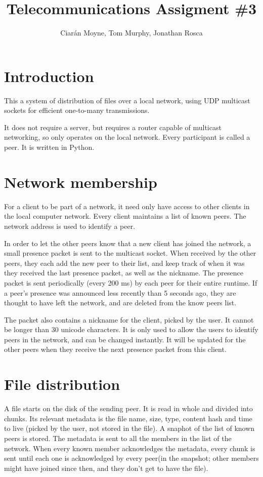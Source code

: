 \documentclass[a4paper, 10pt]{report}
\title{Telecommunications Assigment \#3}
\author{Ciar\'{a}n Moyne, Tom Murphy, Jonathan Rosca}
\begin{document}
\maketitle
\section{Introduction}
This a system of distribution of files over a local network, using UDP multicast sockets for efficient one-to-many transmissions. 

It does not require a server, but requires a router capable of multicast networking, so only operates on the local network. Every participant is called a peer. It is written in Python.


\section{Network membership}
For a client to be part of a network, it need only have access to other clients in the local computer network. Every client maintains a list of known peers. The network address is used to identify a peer.

In order to let the other peers know that a new client has joined the network, a small presence packet is sent to the multicast socket. When received by the other peers, they each add the new peer to their list, and keep track of when it was they received the last presence packet, as well as the nickname. The presence packet is sent periodically (every 200 ms) by each peer for their entire runtime. If a peer's presence was announced less recently than 5 seconds ago, they are thought to have left the network, and are deleted from the know peers list.

The packet also contains a nickname for the client, picked by the user. It cannot be longer than 30 unicode characters. It is only used to allow the users to identify peers in the network, and can be changed instantly. It will be updated for the other peers when they receive the next presence packet from this client.


\section{File distribution}
A file starts on the disk of the sending peer. It is read in whole and divided into chunks. Its relevant metadata is the file name, size, type, content hash and time to live (picked by the user, not stored in the file). A snaphot of the list of known peers is stored. The metadata is sent to all the members in the list of the network. When every known member acknowledges the metadata, every chunk is sent until each one is acknowledged by every peer(in the snapshot; other members might have joined since then, and they don't get to have the file).
\end{document}
